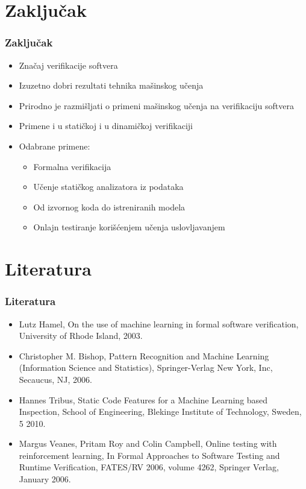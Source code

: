 \documentclass[11pt]{beamer}
\theoremstyle{definition}
\begin{document}
{\section[]{Zaključak}
\label{sec:zakljucak}
\begin{frame}
\frametitle{Zaključak}
\begin{itemize}
\item Značaj verifikacije softvera
\item Izuzetno dobri rezultati tehnika mašinskog učenja
\item Prirodno je razmišljati o primeni mašinskog učenja na verifikaciju softvera
\item Primene i u statičkoj i u dinamičkoj verifikaciji
\item Odabrane primene:
	\begin{itemize}
		\item Formalna verifikacija
		\item Učenje statičkog analizatora iz podataka
		\item Od izvornog koda do istreniranih modela
		\item Onlajn testiranje korišćenjem učenja uslovljavanjem
	\end{itemize}
\end{itemize}
\end{frame}

\section[]{Literatura}
\begin{frame}
\frametitle{Literatura}
\begin{itemize}
\item Lutz Hamel, On the use of machine learning in formal software verification, University of Rhode Island, 2003.
\item Christopher M. Bishop, Pattern Recognition and Machine Learning (Information Science and Statistics), Springer-Verlag New York, Inc, Secaucus, NJ, 2006.
\item Hannes Tribus, Static Code Features for a Machine Learning based Inspection, School of Engineering, Blekinge Institute of Technology, Sweden, 5 2010.
\item Margus Veanes, Pritam Roy and Colin Campbell, Online testing with reinforcement learning, In Formal Approaches to Software Testing and Runtime Verification, FATES/RV 2006, volume 4262, Springer Verlag, January 2006.
\end{itemize}
\end{frame}

}
\end{document}

